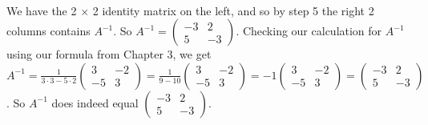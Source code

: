\documentclass[12pt]{article}
\newenvironment{problem}[2][Problem]
{
	\begin{trivlist} 
		\item[\hskip \labelsep {\bfseries #1 #2:}]
	}
{
	\end{trivlist}
	}
\newenvironment{solution}[1][Solution]
{
	\begin{trivlist} 
		\item[\hskip \labelsep {\itshape #1:}]
	}
	{
	\end{trivlist}
}
\begin{document}
\begin{problem}{1}
\begin{solution}
\begin{align*}
\end{align*}
We have the 2 $\times$ 2 identity matrix on the left, and so by step 5 the right 2 columns contains $A^{-1}$. So $A^{-1} = \begin{pmatrix} -3&2\\5&-3\end{pmatrix}$. Checking our calculation for $A^{-1}$ using our formula from Chapter 3, we get $A^{-1} = \frac{1}{3\cdot 3 - 5\cdot 2} \begin{pmatrix}3&-2\\-5&3 \end{pmatrix} = \frac{1}{9-10} \begin{pmatrix}3&-2\\-5&3 \end{pmatrix} = -1 \begin{pmatrix}3&-2\\-5&3 \end{pmatrix}  = \begin{pmatrix} -3&2\\5&-3\end{pmatrix}$. So $A^{-1}$ does indeed equal $\begin{pmatrix} -3&2\\5&-3\end{pmatrix}$.
\end{solution}
\end{problem}
\end{document}
